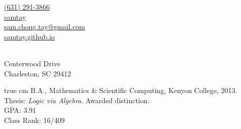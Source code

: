 \documentclass[11pt,article,oneside]{memoir}
\makeatletter
\def\myemail{sam.chong.tay@gmail.com}
\def\myweb{https://samtay.github.io}
\def\myphone{(631) 291-3866}
\def\mygithub{samtay}
\makeatother
\begin{document}
\renewcommand{\labelitemi}{~}

\def\ind{\hangindent=1 true cm\hangafter=1 \noindent}
\def\labelitemi{~}
\renewcommand{\labelitemii}{~}


\pagestyle{kjh}


\hfill
\begin{minipage}[t]{1.6in}
  \flushright
    \footnotesize
      \href{tel:\myphone}{\myphone} \, \faPhone \\
      \vspace{.2em}
      \href{https://github.com/samtay}{\mygithub} \, \faGithub  \\
      \vspace{.2em}
      \href{mailto:\myemail}{\myemail} \, \faEnvelope \\
      \vspace{.2em}
      \href{\myweb}{samtay.github.io} \, \faGlobe
    \normalsize
\end{minipage}


\vspace{-.69in} %
{} \\

\vspace{-.03in} %
\footnotesize
   Centerwood Drive \\
  \noindent Charleston, \textsc{SC} 29412
\normalsize
\reversemarginpar

\bigskip
\medskip


\ind B.A., Mathematics \& Scientific Computing, Kenyon College, 2013. \\
\footnotesize
  Thesis: \emph{Logic via Algebra}. Awarded distinction. \\
  GPA: 3.91 \\
  Class Rank: 16/409
\normalsize
\vspace{0.05in}
\end{document}
